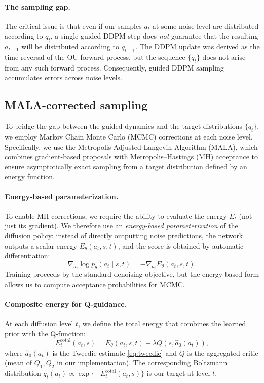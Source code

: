 \documentclass{article}
\theoremstyle{plain}
\theoremstyle{definition}
\theoremstyle{remark}
\begin{document}
\paragraph{The sampling gap.}
The critical issue is that even if our samples $a_t$ at some noise level are distributed according to $q_t$, a single guided DDPM step does \emph{not} guarantee that the resulting $a_{t-1}$ will be distributed according to $q_{t-1}$.
The DDPM update was derived as the time-reversal of the OU forward process, but the sequence $\{q_t\}$ does not arise from any such forward process.
Consequently, guided DDPM sampling accumulates errors across noise levels.

\subsection{MALA-corrected sampling}
\label{sec:mala}

To bridge the gap between the guided dynamics and the target distributions $\{q_t\}$, we employ Markov Chain Monte Carlo (MCMC) corrections at each noise level.
Specifically, we use the Metropolis-Adjusted Langevin Algorithm (MALA), which combines gradient-based proposals with Metropolis--Hastings (MH) acceptance to ensure asymptotically exact sampling from a target distribution defined by an energy function.

\paragraph{Energy-based parameterization.}
To enable MH corrections, we require the ability to evaluate the energy $E_t$ (not just its gradient).
We therefore use an \emph{energy-based parameterization} of the diffusion policy: instead of directly outputting noise predictions, the network outputs a scalar energy $E_\theta(a_t, s, t)$, and the score is obtained by automatic differentiation:
\begin{equation}
  \nabla_{a_t} \log p_\theta(a_t \mid s, t) = -\nabla_{a_t} E_\theta(a_t, s, t).
  \label{eq:energy-param}
\end{equation}
Training proceeds by the standard denoising objective, but the energy-based form allows us to compute acceptance probabilities for MCMC.

\paragraph{Composite energy for Q-guidance.}
At each diffusion level $t$, we define the total energy that combines the learned prior with the Q-function:
\begin{equation}
  E_t^{\text{total}}(a_t, s) = E_\theta(a_t, s, t) - \lambda Q(s, \hat{a}_0(a_t)),
  \label{eq:total-energy}
\end{equation}
where $\hat{a}_0(a_t)$ is the Tweedie estimate \cref{eq:tweedie} and $Q$ is the aggregated critic (mean of $Q_1, Q_2$ in our implementation).
The corresponding Boltzmann distribution $q_t(a_t) \propto \exp\{-E_t^{\text{total}}(a_t, s)\}$ is our target at level $t$.
\end{document}
